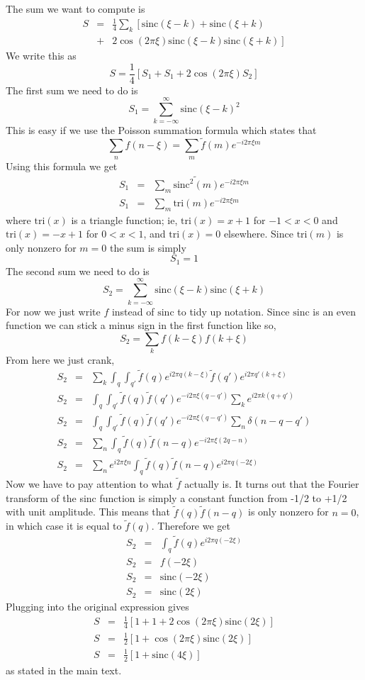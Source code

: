 The sum we want to compute is\begin{eqnarray*}
S & = & \frac{1}{4}\sum_{k}\left[\textrm{sinc}(\xi-k)+\textrm{sinc}(\xi+k)\right.\\
 & + & \left.2\cos(2\pi\xi)\textrm{sinc}(\xi-k)\textrm{sinc}(\xi+k)\right]\end{eqnarray*}
We write this as\[
S=\frac{1}{4}\left[S_{1}+S_{1}+2\cos(2\pi\xi)S_{2}\right]\]
The first sum we need to do is\[
S_{1}=\sum_{k=-\infty}^{\infty}\textrm{sinc}(\xi-k)^{2}\]
This is easy if we use the Poisson summation formula which states
that\[
\sum_{n}f(n-\xi)=\sum_{m}\tilde{f}(m)e^{-i2\pi\xi m}\]
Using this formula we get\begin{eqnarray*}
S_{1} & = & \sum_{m}\widetilde{\textrm{sinc}^{2}\left(m\right)}e^{-i2\pi\xi m}\\
S_{1} & = & \sum_{m}\textrm{tri}(m)e^{-i2\pi\xi m}\end{eqnarray*}
where $\textrm{tri}(x)$ is a triangle function; ie, $\textrm{tri}(x)=x+1$
for $-1<x<0$ and $\textrm{tri}(x)=-x+1$ for $0<x<1$, and $\textrm{tri}(x)=0$
elsewhere. Since $\textrm{tri}(m)$ is only nonzero for $m=0$ the
sum is simply\[
S_{1}=1\]
The second sum we need to do is\[
S_{2}=\sum_{k=-\infty}^{\infty}\textrm{sinc}(\xi-k)\textrm{sinc}(\xi+k)\]
For now we just write $f$ instead of $\textrm{sinc}$ to tidy up
notation. Since $\textrm{sinc}$ is an even function we can stick
a minus sign in the first function like so,\[
S_{2}=\sum_{k}f(k-\xi)f(k+\xi)\]
From here we just crank,\begin{eqnarray*}
S_{2} & = & \sum_{k}\int_{q}\int_{q'}\tilde{f}(q)e^{i2\pi q(k-\xi)}\tilde{f}(q')e^{i2\pi q'(k+\xi)}\\
S_{2} & = & \int_{q}\int_{q'}\tilde{f}(q)\tilde{f}(q')e^{-i2\pi\xi(q-q')}\sum_{k}e^{i2\pi k(q+q')}\\
S_{2} & = & \int_{q}\int_{q'}\tilde{f}(q)\tilde{f}(q')e^{-i2\pi\xi(q-q')}\sum_{n}\delta(n-q-q')\\
S_{2} & = & \sum_{n}\int_{q}\tilde{f}(q)\tilde{f}(n-q)e^{-i2\pi\xi(2q-n)}\\
S_{2} & = & \sum_{n}e^{i2\pi\xi n}\int_{q}\tilde{f}(q)\tilde{f}(n-q)e^{i2\pi q(-2\xi)}\end{eqnarray*}
Now we have to pay attention to what $\tilde{f}$ actually is. It
turns out that the Fourier transform of the sinc function is simply
a constant function from -1/2 to +1/2 with unit amplitude. This means
that $\tilde{f}(q)\tilde{f}(n-q)$ is only nonzero for $n=0$, in
which case it is equal to $\tilde{f}(q)$. Therefore we get\begin{eqnarray*}
S_{2} & = & \int_{q}\tilde{f}(q)e^{i2\pi q(-2\xi)}\\
S_{2} & = & f(-2\xi)\\
S_{2} & = & \textrm{sinc}(-2\xi)\\
S_{2} & = & \textrm{sinc}(2\xi)\end{eqnarray*}
Plugging into the original expression gives\begin{eqnarray*}
S & = & \frac{1}{4}\left[1+1+2\cos(2\pi\xi)\textrm{sinc}(2\xi)\right]\\
S & = & \frac{1}{2}\left[1+\cos(2\pi\xi)\textrm{sinc}(2\xi)\right]\\
S & = & \frac{1}{2}\left[1+\textrm{sinc}(4\xi)\right]\end{eqnarray*}
as stated in the main text.
